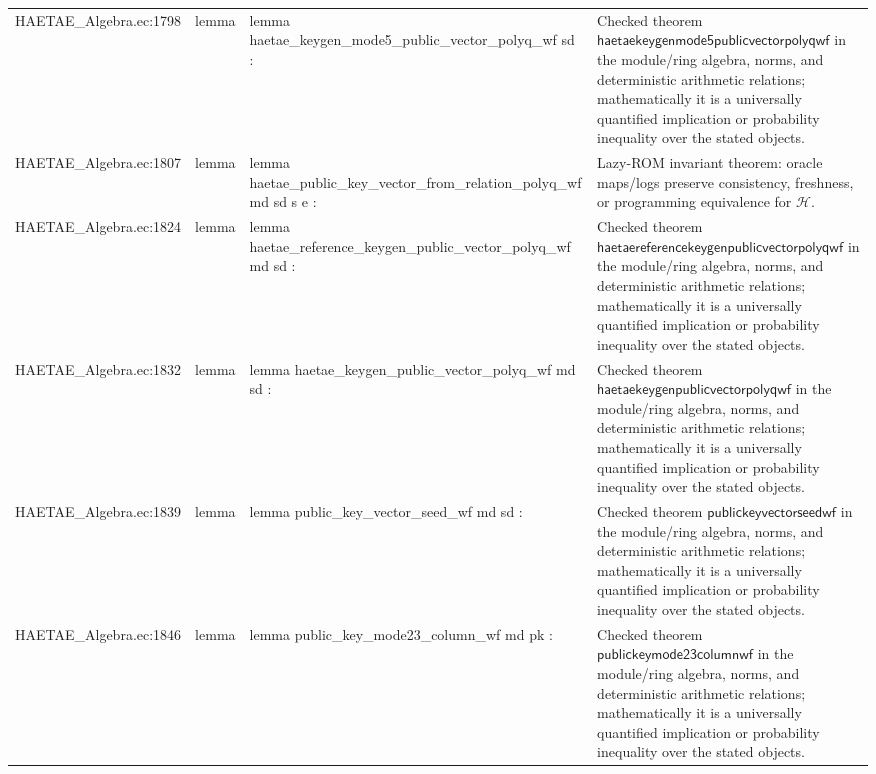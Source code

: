 \documentclass[10pt]{article}
\begin{document}
\begin{longtable}{L{0.11\textwidth}L{0.055\textwidth}L{0.385\textwidth}L{0.41\textwidth}}
HAETAE\_\allowbreak{}Algebra.\allowbreak{}ec:\allowbreak{}1798 & lemma & {\ttfamily\scriptsize lemma haetae\_\allowbreak{}keygen\_\allowbreak{}mode5\_\allowbreak{}public\_\allowbreak{}vector\_\allowbreak{}polyq\_\allowbreak{}wf sd :} & Checked theorem $\mathsf{haetaekeygenmode5publicvectorpolyqwf}$ in the module/ring algebra, norms, and deterministic arithmetic relations; mathematically it is a universally quantified implication or probability inequality over the stated objects. \\
HAETAE\_\allowbreak{}Algebra.\allowbreak{}ec:\allowbreak{}1807 & lemma & {\ttfamily\scriptsize lemma haetae\_\allowbreak{}public\_\allowbreak{}key\_\allowbreak{}vector\_\allowbreak{}from\_\allowbreak{}relation\_\allowbreak{}polyq\_\allowbreak{}wf md sd s e :} & Lazy-ROM invariant theorem: oracle maps/logs preserve consistency, freshness, or programming equivalence for $\mathcal H$. \\
HAETAE\_\allowbreak{}Algebra.\allowbreak{}ec:\allowbreak{}1824 & lemma & {\ttfamily\scriptsize lemma haetae\_\allowbreak{}reference\_\allowbreak{}keygen\_\allowbreak{}public\_\allowbreak{}vector\_\allowbreak{}polyq\_\allowbreak{}wf md sd :} & Checked theorem $\mathsf{haetaereferencekeygenpublicvectorpolyqwf}$ in the module/ring algebra, norms, and deterministic arithmetic relations; mathematically it is a universally quantified implication or probability inequality over the stated objects. \\
HAETAE\_\allowbreak{}Algebra.\allowbreak{}ec:\allowbreak{}1832 & lemma & {\ttfamily\scriptsize lemma haetae\_\allowbreak{}keygen\_\allowbreak{}public\_\allowbreak{}vector\_\allowbreak{}polyq\_\allowbreak{}wf md sd :} & Checked theorem $\mathsf{haetaekeygenpublicvectorpolyqwf}$ in the module/ring algebra, norms, and deterministic arithmetic relations; mathematically it is a universally quantified implication or probability inequality over the stated objects. \\
HAETAE\_\allowbreak{}Algebra.\allowbreak{}ec:\allowbreak{}1839 & lemma & {\ttfamily\scriptsize lemma public\_\allowbreak{}key\_\allowbreak{}vector\_\allowbreak{}seed\_\allowbreak{}wf md sd :} & Checked theorem $\mathsf{publickeyvectorseedwf}$ in the module/ring algebra, norms, and deterministic arithmetic relations; mathematically it is a universally quantified implication or probability inequality over the stated objects. \\
HAETAE\_\allowbreak{}Algebra.\allowbreak{}ec:\allowbreak{}1846 & lemma & {\ttfamily\scriptsize lemma public\_\allowbreak{}key\_\allowbreak{}mode23\_\allowbreak{}column\_\allowbreak{}wf md pk :} & Checked theorem $\mathsf{publickeymode23columnwf}$ in the module/ring algebra, norms, and deterministic arithmetic relations; mathematically it is a universally quantified implication or probability inequality over the stated objects. \\

\end{longtable}
\end{document}
